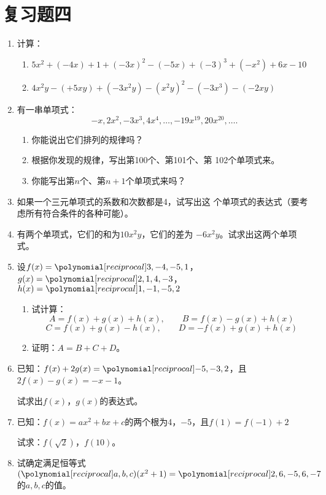 \section*{复习题四}
\begin{enumerate}
    \item 计算：
    \begin{enumerate}
        \item $5x^2+(-4x)+1+(-3x)^2-(-5x)+(-3)^3+(-x^2)+6x-10$
        \item $4x^2y-(+5xy)+(-3x^2y)-(x^2y)^2-(-3x^3)-(-2xy)$
    \end{enumerate}
\item 有一串单项式：
\[-x,2x^2,-3x^3,4x^4,\ldots,-19x^{19},20x^{20},\ldots. \]
\begin{enumerate}
    \item 你能说出它们排列的规律吗？
    \item 根据你发现的规律，写出第100个、第101个、第
102个单项式来。
\item 你能写出第$n$个、第$n+1$个单项式来吗？
\end{enumerate}

\item 如果一个三元单项式的系数和次数都是4，试写出这
个单项式的表达式（要考虑所有符合条件的各种可能）。
\item  有两个单项式，它们的和为$10x^2y$，它们的差为
$-6x^2y$。试求出这两个单项式。

\item 设$f(x)=\poly{3,-4,-5,1}$，$g(x)=\poly{2,1,4,-3}$，$h(x)=\poly{1,-1,-5,2}$
\begin{enumerate}
    \item 试计算：
    \[A=f(x)+g(x)+h(x),\qquad B=f(x)-g(x)+h(x)\]
    \[C=f(x)+g(x)-h(x),\qquad D=-f(x)+g(x)+h(x)\]
    \item 证明：$A=B+C+D$。
\end{enumerate}

\item 已知：$f(x)+2g(x)=\poly{-5,-3,2}$，且$2f(x)-g(x)=-x-1$。

试求出$f(x)$，$g(x)$的表达式。

\item 已知：$f(x)=ax^2+bx+c$的两个根为4，$-5$，且$f(1)=f(-1)+2$

试求：$f\left(\sqrt{2}\right)$，$f(10)$。

\item 试确定满足恒等式
$(\poly{a,b,c})(x^2+1)=\poly{2,6,-5,6,-7}$
的$a,b,c$的值。


\end{enumerate}
